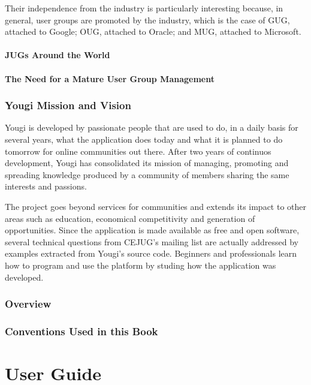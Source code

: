 \documentclass[envcountsame,envcountchap]{svmono}
\begin{document}
Their independence from the industry is particularly interesting because, in general, user groups are promoted by the industry, which is the case of GUG, attached to Google; OUG, attached to Oracle; and MUG, attached to Microsoft.

\subsection{JUGs Around the World}

\subsection{The Need for a Mature User Group Management}

\section{Yougi Mission and Vision}

Yougi is developed by passionate people that are used to do, in a daily basis for several years, what the application does today and what it is planned to do tomorrow for online communities out there. After two years of continuos development, Yougi has consolidated its mission of managing, promoting and spreading knowledge produced by a community of members sharing the same interests and passions.

The project goes beyond services for communities and extends its impact to other areas such as education, economical competitivity and generation of opportunities. Since the application is made available as free and open software, several technical questions from CEJUG's mailing list are actually addressed by examples extracted from Yougi's source code. Beginners and professionals learn how to program and use the platform by studing how the application was developed.

\section{Overview}

\section{Conventions Used in this Book}

\part{User Guide}
\end{document}
